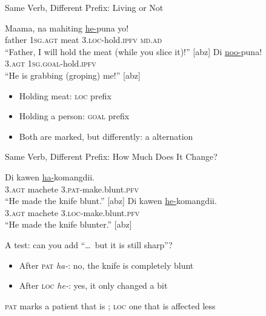 \documentclass{beamer}
\begin{document}
\begin{frame}{Same Verb, Different Prefix: Living or Not}
  \begin{exe}
    \ex
    \gll Maama, na mahiting \ul{he-}puna yo! \\
         father 1\textsc{sg.agt} meat 3.\textsc{loc}-hold.\textsc{ipfv} \textsc{md.ad} \\
    \trans ``Father, I will hold the meat (while you slice it)!'' [abz]
    \ex
    \gll Di \ul{noo-}puna! \\
         3.\textsc{agt} 1\textsc{sg.goal}-hold.\textsc{ipfv} \\
    \trans ``He is grabbing (groping) me!'' [abz]
  \end{exe}
  \vfill
  \begin{itemize}
  \item Holding meat: \textsc{loc} prefix
  \item Holding a person: \textsc{goal} prefix
  \item Both are marked, but differently: a  alternation
  \end{itemize}
\end{frame}

\begin{frame}{Same Verb, Different Prefix: How Much Does It Change?}
  \begin{exe}
    \ex
    \gll Di kawen \ul{ha-}komangdii. \\
         3.\textsc{agt} machete 3.\textsc{pat}-make.blunt.\textsc{pfv} \\
    \trans ``He made the knife blunt.'' [abz]
    \ex
    \gll Di kawen \ul{he-}komangdii. \\
         3.\textsc{agt} machete 3.\textsc{loc}-make.blunt.\textsc{pfv} \\
    \trans ``He made the knife blunter.'' [abz]
  \end{exe}
  \vfill
  A test: can you add ``\ldots\ but it is still sharp''?
  \begin{itemize}
  \item After \textsc{pat} \emph{ha-}: no, the knife is completely blunt
  \item After \textsc{loc} \emph{he-}: yes, it only changed a bit
  \end{itemize}
  \textsc{pat} marks a patient that is ; \textsc{loc} one
  that is affected less \citep{kratochvil:delpada:2015}
\end{frame}
\end{document}
